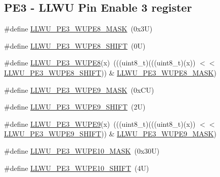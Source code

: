 \subsection*{P\+E3 -\/ L\+L\+WU Pin Enable 3 register}
\begin{DoxyCompactItemize}
\item 
\#define \mbox{\hyperlink{group___l_l_w_u___register___masks_gabe7fce492e2c0201c4bb5af893f5a63d}{L\+L\+W\+U\+\_\+\+P\+E3\+\_\+\+W\+U\+P\+E8\+\_\+\+M\+A\+SK}}~(0x3\+U)
\item 
\#define \mbox{\hyperlink{group___l_l_w_u___register___masks_gaf02591badd7f37915120d0fd627cdf27}{L\+L\+W\+U\+\_\+\+P\+E3\+\_\+\+W\+U\+P\+E8\+\_\+\+S\+H\+I\+FT}}~(0\+U)
\item 
\#define \mbox{\hyperlink{group___l_l_w_u___register___masks_gad6e40b93385848a0a6dc1177f884107a}{L\+L\+W\+U\+\_\+\+P\+E3\+\_\+\+W\+U\+P\+E8}}(x)~(((uint8\+\_\+t)(((uint8\+\_\+t)(x)) $<$$<$ \mbox{\hyperlink{group___l_l_w_u___register___masks_gaf02591badd7f37915120d0fd627cdf27}{L\+L\+W\+U\+\_\+\+P\+E3\+\_\+\+W\+U\+P\+E8\+\_\+\+S\+H\+I\+FT}})) \& \mbox{\hyperlink{group___l_l_w_u___register___masks_gabe7fce492e2c0201c4bb5af893f5a63d}{L\+L\+W\+U\+\_\+\+P\+E3\+\_\+\+W\+U\+P\+E8\+\_\+\+M\+A\+SK}})
\item 
\#define \mbox{\hyperlink{group___l_l_w_u___register___masks_gad03733955d18194da002aeceedc2edf5}{L\+L\+W\+U\+\_\+\+P\+E3\+\_\+\+W\+U\+P\+E9\+\_\+\+M\+A\+SK}}~(0x\+C\+U)
\item 
\#define \mbox{\hyperlink{group___l_l_w_u___register___masks_ga26cad28b7fe4fd2da53ece9d3744016c}{L\+L\+W\+U\+\_\+\+P\+E3\+\_\+\+W\+U\+P\+E9\+\_\+\+S\+H\+I\+FT}}~(2\+U)
\item 
\#define \mbox{\hyperlink{group___l_l_w_u___register___masks_ga644ab845edd61fbd851fca7254c6a3f0}{L\+L\+W\+U\+\_\+\+P\+E3\+\_\+\+W\+U\+P\+E9}}(x)~(((uint8\+\_\+t)(((uint8\+\_\+t)(x)) $<$$<$ \mbox{\hyperlink{group___l_l_w_u___register___masks_ga26cad28b7fe4fd2da53ece9d3744016c}{L\+L\+W\+U\+\_\+\+P\+E3\+\_\+\+W\+U\+P\+E9\+\_\+\+S\+H\+I\+FT}})) \& \mbox{\hyperlink{group___l_l_w_u___register___masks_gad03733955d18194da002aeceedc2edf5}{L\+L\+W\+U\+\_\+\+P\+E3\+\_\+\+W\+U\+P\+E9\+\_\+\+M\+A\+SK}})
\item 
\#define \mbox{\hyperlink{group___l_l_w_u___register___masks_ga6d8e812233df26a72459712117996efa}{L\+L\+W\+U\+\_\+\+P\+E3\+\_\+\+W\+U\+P\+E10\+\_\+\+M\+A\+SK}}~(0x30\+U)
\item 
\#define \mbox{\hyperlink{group___l_l_w_u___register___masks_ga1686c8515045158eeef3fc0c5df480d9}{L\+L\+W\+U\+\_\+\+P\+E3\+\_\+\+W\+U\+P\+E10\+\_\+\+S\+H\+I\+FT}}~(4\+U)

\end{DoxyCompactItemize}

